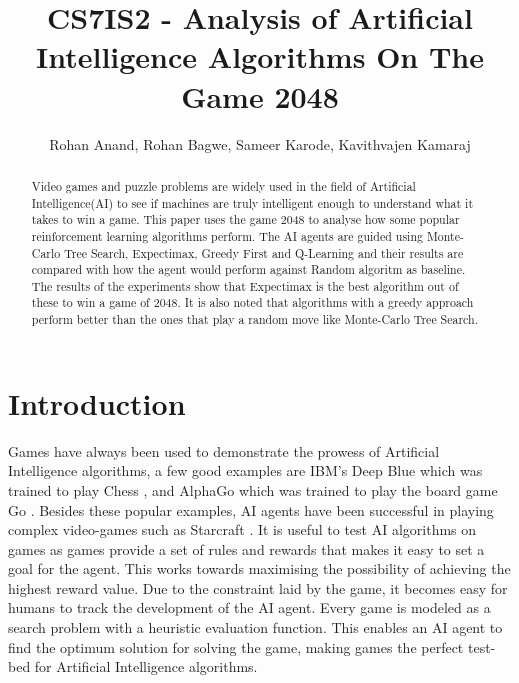 \documentclass{svproc}
\begin{document}
    \mainmatter
    \title{CS7IS2 - Analysis of Artificial Intelligence Algorithms On The Game 2048
    }
    \author{Rohan Anand, Rohan Bagwe, Sameer Karode, Kavithvajen Kamaraj}


    \maketitle

    \begin{abstract}
        Video games and puzzle problems are widely used in the field of Artificial Intelligence(AI) to see if machines are truly intelligent enough to understand what it takes to win a game. This paper uses the game 2048 to analyse how some popular reinforcement learning algorithms perform. The AI agents are guided using Monte-Carlo Tree Search, Expectimax, Greedy First and Q-Learning and their results are compared with how the agent would perform against Random algoritm as baseline. The results of the experiments show that Expectimax is the best algorithm out of these to win a game of 2048. It is also noted that algorithms with a greedy approach perform better than the ones that play a random move like Monte-Carlo Tree Search.
        
    \end{abstract}

    \section{Introduction}

Games have always been used to demonstrate the prowess of Artificial Intelligence algorithms, a few good examples are IBM’s Deep Blue which was trained to play Chess \cite{deepBlue}, and AlphaGo which was trained to play the board game Go \cite{alphago}. Besides these popular examples, AI agents have been successful in playing complex video-games such as Starcraft \cite{starcraft}. It is useful to test AI algorithms on games as games provide a set of rules and rewards that makes it easy to set a goal for the agent. This works towards maximising the possibility of achieving the highest reward value. Due to the constraint laid by the game, it becomes easy for humans to track the development of the AI agent. Every game is modeled as a search problem with a heuristic evaluation function. This enables an AI agent to find the optimum solution for solving the game, making games the perfect test-bed for Artificial Intelligence algorithms.
\end{document}
